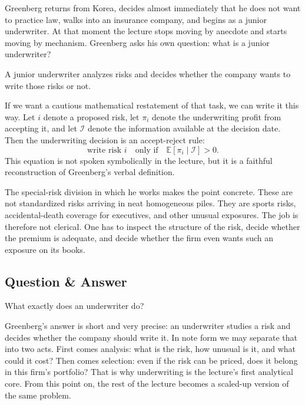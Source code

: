 Greenberg returns from Korea, decides almost immediately that he does not want to practice law, walks into an insurance company, and begins as a junior underwriter. At that moment the lecture stops moving by anecdote and starts moving by mechanism. Greenberg asks his own question: what is a junior underwriter?

\begin{definition}
A junior underwriter analyzes risks and decides whether the company wants to write those risks or not.
\end{definition}

If we want a cautious mathematical restatement of that task, we can write it this way. Let \(i\) denote a proposed risk, let \(\pi_i\) denote the underwriting profit from accepting it, and let \(\mathcal{I}\) denote the information available at the decision date. Then the underwriting decision is an accept-reject rule:
\begin{equation}
\text{write risk } i
\quad \text{only if} \quad
\mathbb{E}[\pi_i \mid \mathcal{I}] > 0.
\end{equation}
This equation is not spoken symbolically in the lecture, but it is a faithful reconstruction of Greenberg's verbal definition.

The special-risk division in which he works makes the point concrete. These are not standardized risks arriving in neat homogeneous piles. They are sports risks, accidental-death coverage for executives, and other unusual exposures. The job is therefore not clerical. One has to inspect the structure of the risk, decide whether the premium is adequate, and decide whether the firm even wants such an exposure on its books.

\subsection{Question \& Answer}

What exactly does an underwriter do?

Greenberg's answer is short and very precise: an underwriter studies a risk and decides whether the company should write it. In note form we may separate that into two acts. First comes analysis: what is the risk, how unusual is it, and what could it cost? Then comes selection: even if the risk can be priced, does it belong in this firm's portfolio? That is why underwriting is the lecture's first analytical core. From this point on, the rest of the lecture becomes a scaled-up version of the same problem.

